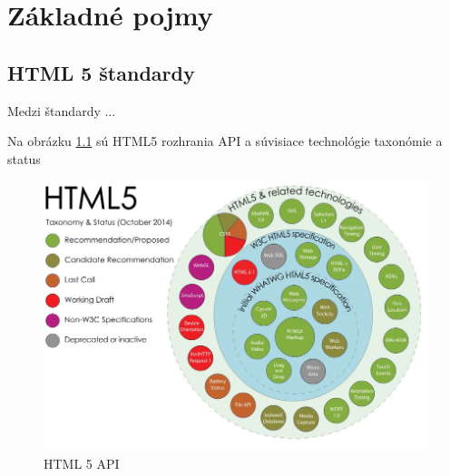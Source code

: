 \chapter{Základné pojmy}




\section{\acs{HTML} 5 štandardy}

Medzi štandardy ... 

Na obrázku \ref{fig:obrazokHTML} sú HTML5 rozhrania API a súvisiace technológie taxonómie a status

\begin{figure}
\centering
\includegraphics[width=0.7\linewidth]{obrazky/obrazokHTML}
\caption{HTML 5 API}
\label{fig:obrazokHTML}
\end{figure}








